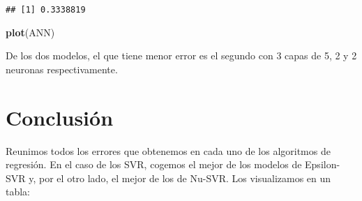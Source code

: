 \documentclass[
]{article}
\newenvironment{Shaded}{\begin{snugshade}}{\end{snugshade}}
\newcommand{\DataTypeTok}[1]{\textcolor[rgb]{0.13,0.29,0.53}{#1}}
\newcommand{\DecValTok}[1]{\textcolor[rgb]{0.00,0.00,0.81}{#1}}
\newcommand{\FloatTok}[1]{\textcolor[rgb]{0.00,0.00,0.81}{#1}}
\newcommand{\KeywordTok}[1]{\textcolor[rgb]{0.13,0.29,0.53}{\textbf{#1}}}
\newcommand{\NormalTok}[1]{#1}
\newcommand{\OperatorTok}[1]{\textcolor[rgb]{0.81,0.36,0.00}{\textbf{#1}}}
\newcommand{\OtherTok}[1]{\textcolor[rgb]{0.56,0.35,0.01}{#1}}
\newcommand{\StringTok}[1]{\textcolor[rgb]{0.31,0.60,0.02}{#1}}
\begin{document}
\begin{Shaded}
\end{Shaded}

\begin{verbatim}
## [1] 0.3338819
\end{verbatim}

\begin{Shaded}
\begin{Highlighting}[]
\KeywordTok{plot}\NormalTok{(ANN)}
\end{Highlighting}
\end{Shaded}

De los dos modelos, el que tiene menor error es el segundo con 3 capas
de 5, 2 y 2 neuronas respectivamente.

\hypertarget{conclusiuxf3n}{%
\section{Conclusión}\label{conclusiuxf3n}}

Reunimos todos los errores que obtenemos en cada uno de los algoritmos
de regresión. En el caso de los SVR, cogemos el mejor de los modelos de
Epsilon-SVR y, por el otro lado, el mejor de los de Nu-SVR. Los
visualizamos en un tabla:
\end{document}
